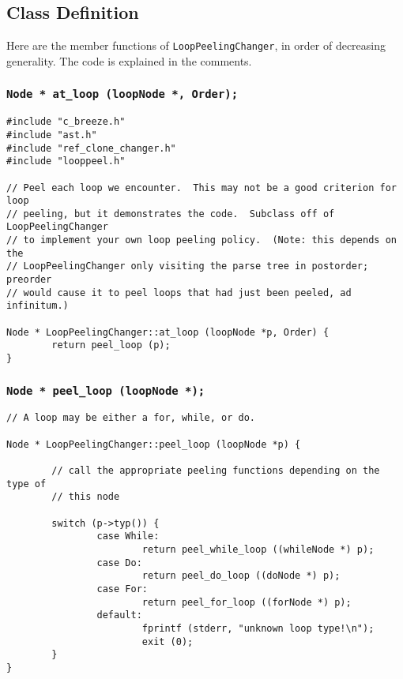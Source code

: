 \documentclass[10pt]{article}
\begin{document}
\subsection{Class Definition}

Here are the member functions of {\tt LoopPeelingChanger}, in order of
decreasing generality.  The code is explained in the comments.

\subsubsection{{\tt Node * at\_loop (loopNode *, Order);}}

\begin{small}
\begin{verbatim}
#include "c_breeze.h"
#include "ast.h"
#include "ref_clone_changer.h"
#include "looppeel.h"

// Peel each loop we encounter.  This may not be a good criterion for loop 
// peeling, but it demonstrates the code.  Subclass off of LoopPeelingChanger 
// to implement your own loop peeling policy.  (Note: this depends on the 
// LoopPeelingChanger only visiting the parse tree in postorder; preorder 
// would cause it to peel loops that had just been peeled, ad infinitum.)

Node * LoopPeelingChanger::at_loop (loopNode *p, Order) {
        return peel_loop (p);
}
\end{verbatim}
\end{small}

\subsubsection{{\tt Node * peel\_loop (loopNode *);}}

\begin{small}
\begin{verbatim}
// A loop may be either a for, while, or do.

Node * LoopPeelingChanger::peel_loop (loopNode *p) {

        // call the appropriate peeling functions depending on the type of 
        // this node

        switch (p->typ()) {
                case While:
                        return peel_while_loop ((whileNode *) p);
                case Do:
                        return peel_do_loop ((doNode *) p);
                case For:
                        return peel_for_loop ((forNode *) p);
                default:
                        fprintf (stderr, "unknown loop type!\n");
                        exit (0);
        }
}
\end{verbatim}
\end{small}
\end{document}
